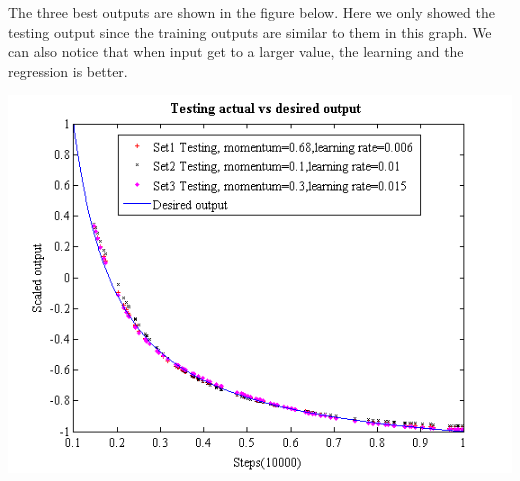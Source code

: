 \documentclass[epsfig]{article}
\begin{document}
\begin{table}[htbp] 
	\centering
	\caption{Parameters of Training BP Network to Fit $f(x) = 1/x$ that gives the best results}

\end{table}



The three best outputs are shown in the figure below. Here we only showed the testing output since the training outputs are similar to them in this graph. We can also notice that when input get to a larger value, the learning and the regression is better.



	\centerline{\includegraphics[width=6in]{best_output.png} }
\end{document}
